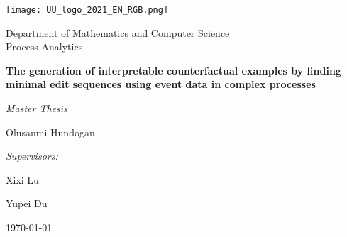 \documentclass[./../paper.tex]{subfiles}
\begin{document}
\begin{titlepage}
    \centering
    \texttt{[image: UU\_logo\_2021\_EN\_RGB.png]}\par
    Department of Mathematics and Computer Science\\
    Process Analytics

    \vspace{3cm}
    {\LARGE\textbf{The generation of interpretable counterfactual examples by finding minimal edit sequences using event data in complex processes}}\par\vspace{0.5cm}
    {\large\textit{Master Thesis}}\par\vspace{1cm}
    {\large Olusanmi Hundogan}\par

    \vfill 

    \emph{Supervisors:}\par
    Xixi Lu\par
    Yupei Du\par

    \today
    \vspace{2cm}


\end{titlepage}
\end{document}
